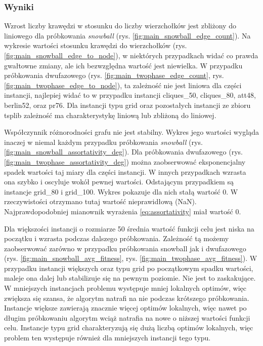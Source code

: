 \subsubsection{Wyniki}



Wzrost liczby krawędzi w stosunku do liczby wierzchołków jest zbliżony do liniowego dla próbkowania \textit{snowball} (rys. \ref{fig:main_snowball_edge_count}).
Na wykresie wartości stosunku krawędzi do wierzchołków (rys. \ref{fig:main_snowball_edge_to_node}), w niektórych przypadkach widać co prawda gwałtowne zmiany, ale
ich bezwzględna wartość jest niewielka.
W przypadku próbkowania dwufazowego (rys. \ref{fig:main_twophase_edge_count}, rys.\ref{fig:main_twophase_edge_to_node}), ta zależność nie jest liniowa dla części instancji,
najlepiej widać to w przypadku instancji cliques\_50, cliques\_80, att48, berlin52, oraz pr76.
Dla instancji typu grid oraz pozostałych instancji ze zbioru tsplib zależność ma charakterystykę liniową lub zbliżoną do liniowej.

Współczynnik różnorodności grafu nie jest stabilny. Wykres jego wartości wygląda inaczej w niemal każdym przypadku
próbkowania \textit{snowball} (rys. \ref{fig:main_snowball_assortativity_deg}).
Dla próbkowania dwufazowego (rys. \ref{fig:main_twophase_assortativity_deg}) można zaobserwować eksponencjalny spadek wartości taj miary dla części instancji.
W innych przypadkach wzrasta ona szybko i oscyluje wokół pewnej wartości.
Odstającym przypadkiem są instancje grid\_80 i grid\_100. Wykres pokazuje dla nich stałą wartość 0.
W rzeczywistości otrzymano tutaj wartość nieprawidłową (NaN). Najprawdopodobniej mianownik wyrażenia \ref{eq:assortativity}
miał wartość 0.

Dla większości instancji o rozmiarze 50 średnia wartość funkcji celu jest niska na początku i wzrasta podczas dalszego próbkowania.
Zależność tą możemy zaobserwować zarówno w przypadku próbkowania snowball jak i dwufazowego (rys. \ref{fig:main_snowball_avg_fitness}, rys. \ref{fig:main_twophase_avg_fitness}).
W przypadku instancji większych oraz typu grid po początkowym spadku wartości, maleje ona dalej lub stabilizuje się na pewnym poziomie.
Nie jest to zaskakujące. W mniejszych instancjach problemu występuje mniej lokalnych optimów, więc zwiększa się szansa, że algorytm
natrafi na nie podczas krótszego próbkowania. Instancje większe zawierają znacznie więcej optimów lokalnych, więc nawet po długim próbkowaniu
algorytm wciąż natrafia na nowe o niższej wartości funkcji celu. Instancje typu grid charakteryzują się dużą liczbą optimów lokalnych,
więc problem ten występuje również dla mniejszych instancji tego typu.

